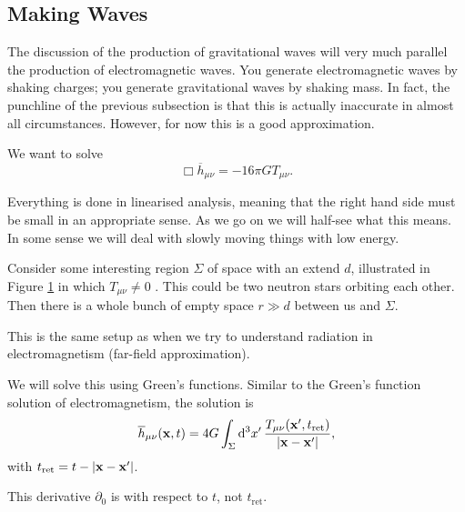 
\subsection{Making Waves}%
\label{sub:making_waves}

The discussion of the production of gravitational waves will very much parallel the production of electromagnetic waves.
You generate electromagnetic waves by shaking charges; you generate gravitational waves by shaking mass.
In fact, the punchline of the previous subsection is that this is actually inaccurate in almost all circumstances. However, for now this is a good approximation.

We want to solve
\begin{equation}
  \label{eq:22-1}
  \Box \overline{h}_{\mu\nu} = -16\pi G T_{\mu\nu}.
\end{equation}

Everything is done in linearised analysis, meaning that the right hand side  must be small in an appropriate sense.
As we go on we will half-see what this means. In some sense we will deal with slowly moving things with low energy.

\begin{figure}[tbhp]
  \centering
  \def\svgwidth{0.4\columnwidth}
  
  \caption{}
  \label{fig:l22f1}
\end{figure}

Consider some interesting region $\Sigma$ of space with an extend $d$, illustrated in Figure \ref{fig:l22f1} in which  $T_{\mu\nu} \neq 0$ . This could be two neutron stars orbiting each other.
Then there is a whole bunch of empty space $r \gg d$  between us and $\Sigma$.
\begin{leftbar}
  \begin{note}
    This is the same setup as when we try to understand radiation in electromagnetism (far-field approximation).
  \end{note}
\end{leftbar}

We will solve this using Green's functions.
Similar to the Green's function solution of electromagnetism, the solution is
\begin{equation}
  \overline{h}_{\mu\nu}(\vb{x}, t) = 4 G \int_\Sigma \dd[3]{x'} \frac{T_{\mu\nu}(\vb{x}', t_{\text{ret}})}{\abs{\vb{x} - \vb{x}'}},
\end{equation} 
with $t_{\text{ret}} = t - \abs{\vb{x} - \vb{x}'}$.
\begin{remark}
  This derivative $\partial_0$ is with respect to $t$, not $t_{\text{ret}}$.
\end{remark}

